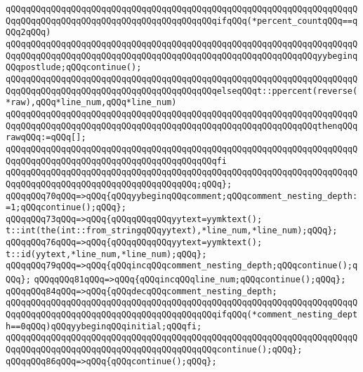 \verb|qQQqqQQqqQQqqQQqqQQqqQQqqQQqqQQqqQQqqQQqqQQqqQQqqQQqqQQqqQQqqQQqqQQqqQQqqQQqqQQqqQQqqQQqqQQqqQQqqQQqqQQqqQQqqQQqifqQQq(*percent_countqQQq==qQQq2qQQq)|\newline
\verb|qQQqqQQqqQQqqQQqqQQqqQQqqQQqqQQqqQQqqQQqqQQqqQQqqQQqqQQqqQQqqQQqqQQqqQQqqQQqqQQqqQQqqQQqqQQqqQQqqQQqqQQqqQQqqQQqqQQqqQQqqQQqqQQqqQQqyybeginqQQqpostlude;qQQqcontinue();|\newline
\verb|qQQqqQQqqQQqqQQqqQQqqQQqqQQqqQQqqQQqqQQqqQQqqQQqqQQqqQQqqQQqqQQqqQQqqQQqqQQqqQQqqQQqqQQqqQQqqQQqqQQqqQQqqQQqqQQqelseqQQqt::ppercent(reverse(*raw),qQQq*line_num,qQQq*line_num)|\newline
\verb|qQQqqQQqqQQqqQQqqQQqqQQqqQQqqQQqqQQqqQQqqQQqqQQqqQQqqQQqqQQqqQQqqQQqqQQqqQQqqQQqqQQqqQQqqQQqqQQqqQQqqQQqqQQqqQQqqQQqqQQqqQQqqQQqqQQqthenqQQqrawqQQq:=qQQq[];|\newline
\verb|qQQqqQQqqQQqqQQqqQQqqQQqqQQqqQQqqQQqqQQqqQQqqQQqqQQqqQQqqQQqqQQqqQQqqQQqqQQqqQQqqQQqqQQqqQQqqQQqqQQqqQQqqQQqqQQqfi|\newline
\verb|qQQqqQQqqQQqqQQqqQQqqQQqqQQqqQQqqQQqqQQqqQQqqQQqqQQqqQQqqQQqqQQqqQQqqQQqqQQqqQQqqQQqqQQqqQQqqQQqqQQqqQQqqQQq;qQQq};|\newline
\verb|qQQqqQQq70qQQq=>qQQq{qQQqyybeginqQQqcomment;qQQqcomment_nesting_depth:=1;qQQqcontinue();qQQq};|\newline
\verb|qQQqqQQq73qQQq=>qQQq{qQQqqQQqqQQqyytext=yymktext();|\newline
\verb|t::int(the(int::from_stringqQQqyytext),*line_num,*line_num);qQQq};|\newline
\verb|qQQqqQQq76qQQq=>qQQq{qQQqqQQqqQQqyytext=yymktext();|\newline
\verb|t::id(yytext,*line_num,*line_num);qQQq};|\newline
\verb|qQQqqQQq79qQQq=>qQQq{qQQqincqQQqcomment_nesting_depth;qQQqcontinue();qQQq};|\newline
\verb|qQQqqQQq81qQQq=>qQQq{qQQqincqQQqline_num;qQQqcontinue();qQQq};|\newline
\verb|qQQqqQQq84qQQq=>qQQq{qQQqdecqQQqcomment_nesting_depth;|\newline
\verb|qQQqqQQqqQQqqQQqqQQqqQQqqQQqqQQqqQQqqQQqqQQqqQQqqQQqqQQqqQQqqQQqqQQqqQQqqQQqqQQqqQQqqQQqqQQqqQQqqQQqqQQqqQQqqQQqifqQQq(*comment_nesting_depth==0qQQq)qQQqyybeginqQQqinitial;qQQqfi;|\newline
\verb|qQQqqQQqqQQqqQQqqQQqqQQqqQQqqQQqqQQqqQQqqQQqqQQqqQQqqQQqqQQqqQQqqQQqqQQqqQQqqQQqqQQqqQQqqQQqqQQqqQQqqQQqqQQqqQQqcontinue();qQQq};|\newline
\verb|qQQqqQQq86qQQq=>qQQq{qQQqcontinue();qQQq};|\newline
